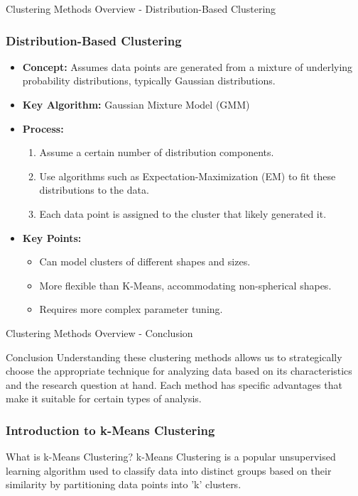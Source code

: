 \documentclass[aspectratio=169]{beamer}
\begin{document}
\begin{frame}[fragile]{Clustering Methods Overview - Distribution-Based Clustering}
    \frametitle{Distribution-Based Clustering}
    \begin{itemize}
        \item \textbf{Concept:} Assumes data points are generated from a mixture of underlying probability distributions, typically Gaussian distributions.
        \item \textbf{Key Algorithm:} Gaussian Mixture Model (GMM)
        \item \textbf{Process:}
        \begin{enumerate}
            \item Assume a certain number of distribution components.
            \item Use algorithms such as Expectation-Maximization (EM) to fit these distributions to the data.
            \item Each data point is assigned to the cluster that likely generated it.
        \end{enumerate}
        \item \textbf{Key Points:}
        \begin{itemize}
            \item Can model clusters of different shapes and sizes.
            \item More flexible than K-Means, accommodating non-spherical shapes.
            \item Requires more complex parameter tuning.
        \end{itemize}
    \end{itemize}
\end{frame}

\begin{frame}[fragile]{Clustering Methods Overview - Conclusion}
    \begin{block}{Conclusion}
        Understanding these clustering methods allows us to strategically choose the appropriate technique for analyzing data based on its characteristics and the research question at hand. Each method has specific advantages that make it suitable for certain types of analysis.
    \end{block}
\end{frame}

\begin{frame}[fragile]
    \frametitle{Introduction to k-Means Clustering}
    \begin{block}{What is k-Means Clustering?}
        k-Means Clustering is a popular unsupervised learning algorithm used to classify data into distinct groups based on their similarity by partitioning data points into 'k' clusters.
    \end{block}
\end{frame}
\end{document}
